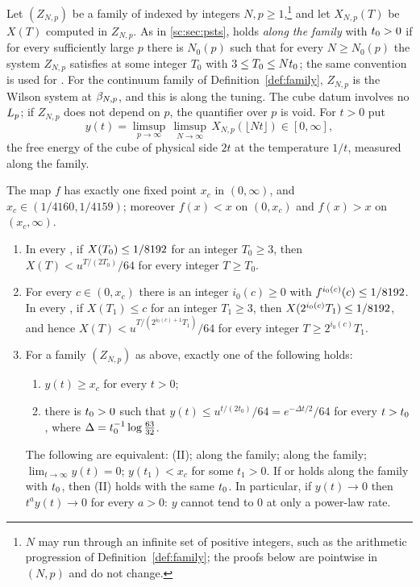 Let $(Z_{N,p})$ be a family of \PSTS{} indexed by integers $N,p\ge1$,\footnote{$N$ may run through an infinite set of positive integers, such as the arithmetic progression of Definition~\ref{def:family}; the proofs below are pointwise in $(N,p)$ and do not change.} and let $X_{N,p}(T)$ be $X(T)$ computed in $Z_{N,p}$. As in \cref{sc:sec:psts}, \Mcirc{} holds \emph{along the family} with $t_0>0$ if for every sufficiently large $p$ there is $N_0(p)$ such that for every $N\ge N_0(p)$ the system $Z_{N,p}$ satisfies \Mcirc{} at some integer $T_0$ with $3\le T_0\le Nt_0$; the same convention is used for \Bcirc{}. For the continuum family of Definition~\ref{def:family}, $Z_{N,p}$ is the Wilson system at $\beta_{N,p}$, and this is \Mcirc{} along the tuning. The cube datum involves no $L_p$; if $Z_{N,p}$ does not depend on $p$, the quantifier over $p$ is void. For $t>0$ put
\[
y(t)=\limsup_{p\to\infty}\,\limsup_{N\to\infty}\,X_{N,p}(\lfloor Nt\rfloor)\in[0,\infty],
\]
the free energy of the cube of physical side $2t$ at the temperature $1/t$, measured along the family.

\begin{theorem}\label{sc:thm:zero-one}
The map $f$ has exactly one fixed point $x_c$ in $(0,\infty)$, and $x_c\in(1/4160,1/4159)$; moreover $f(x)<x$ on $(0,x_c)$ and $f(x)>x$ on $(x_c,\infty)$.
\begin{enumerate}[label=(\alph*)]
\item In every \PSTS{}, if $X(T_0)\le1/8192$ for an integer $T_0\ge3$, then $X(T)<u^{T/(2T_0)}/64$ for every integer $T\ge T_0$.
\item For every $c\in(0,x_c)$ there is an integer $i_0(c)\ge0$ with $f^{i_0(c)}(c)\le1/8192$. In every \PSTS{}, if $X(T_1)\le c$ for an integer $T_1\ge3$, then $X(2^{i_0(c)}T_1)\le1/8192$, and hence $X(T)<u^{T/(2^{i_0(c)+1}T_1)}/64$ for every integer $T\ge2^{i_0(c)}T_1$.
\item For a family $(Z_{N,p})$ as above, exactly one of the following holds:
\begin{enumerate}[label=(\Roman*)]
\item $y(t)\ge x_c$ for every $t>0$;
\item there is $t_0>0$ such that $y(t)\le u^{t/(2t_0)}/64=e^{-\Delta t/2}/64$ for every $t>t_0$, where $\Delta=t_0^{-1}\log\frac{63}{32}$.
\end{enumerate}
The following are equivalent: \textup{(II)}; \Mcirc{} along the family; \Bcirc{} along the family; $\lim_{t\to\infty}y(t)=0$; $y(t_1)<x_c$ for some $t_1>0$. If \Mcirc{} or \Bcirc{} holds along the family with $t_0$, then \textup{(II)} holds with the same $t_0$. In particular, if $y(t)\to0$ then $t^ay(t)\to0$ for every $a>0$: $y$ cannot tend to $0$ at only a power-law rate.
\end{enumerate}
\end{theorem}

